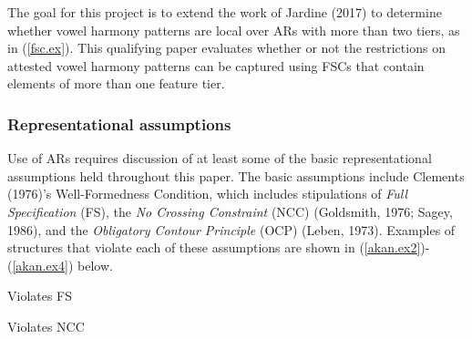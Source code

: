 \documentclass[floatsintext,man]{apa6}
\theoremstyle{definition}
\theoremstyle{definition}
\theoremstyle{definition}
\theoremstyle{remark}
\begin{document}
The goal for this project is to extend the work of Jardine (2017) to
determine whether vowel harmony patterns are local over ARs with more
than two tiers, as in (\ref{fsc.ex}). This qualifying paper evaluates
whether or not the restrictions on attested vowel harmony patterns can
be captured using FSCs that contain elements of more than one feature
tier.

\subsubsection{Representational
assumptions}\label{representational-assumptions}

Use of ARs requires discussion of at least some of the basic
representational assumptions held throughout this paper. The basic
assumptions include Clements (1976)'s Well-Formedness Condition, which
includes stipulations of \emph{Full Specification} (FS), the \emph{No
Crossing Constraint} (NCC) (Goldsmith, 1976; Sagey, 1986), and the
\emph{Obligatory Contour Principle} (OCP) (Leben, 1973). Examples of
structures that violate each of these assumptions are shown in
(\ref{akan.ex2})-(\ref{akan.ex4}) below.

\begin{exe}
\ex \label{akan.ex2} Violates FS
\end{exe}

\begin{exe}
\ex \label{akan.ex3} Violates NCC
\end{exe}
\end{document}
